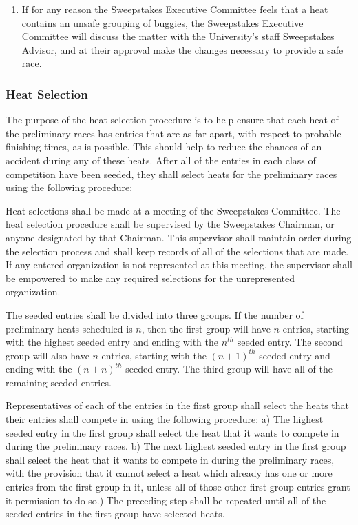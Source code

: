 \begin{enumerate}
		\item If for any reason the Sweepstakes Executive Committee feels that
		a heat contains an unsafe grouping of buggies, the Sweepstakes Executive
		Committee will discuss the matter with the University's staff Sweepstakes
		Advisor, and at their approval make the changes necessary to provide a safe
		race.

	\end{enumerate}

\subsubsection{Heat Selection}
	
	The purpose of the heat selection procedure is to help ensure that each heat of
	the preliminary races has entries that are as far apart, with respect to
	probable finishing times, as is possible. This should help to reduce the
	chances of an accident during any of these heats. After all of the entries in
	each class of competition have been seeded, they shall select heats for the
	preliminary races using the following procedure:

	Heat selections shall be made at a meeting of the Sweepstakes Committee. The
	heat selection procedure shall be supervised by the Sweepstakes Chairman, or
	anyone designated by that Chairman. This supervisor shall maintain order during
	the selection process and shall keep records of all of the selections that are
	made. If any entered organization is not represented at this meeting, the
	supervisor shall be empowered to make any required selections for the
	unrepresented organization.

	The seeded entries shall be divided into three groups. If the number of
	preliminary heats scheduled is $n$, then the first group will have $n$ entries,
	starting with the highest seeded entry and ending with the $n^{th}$ seeded
	entry. The second group will also have $n$ entries, starting with the
	$(n+1)^{th}$ seeded entry and ending with the $(n+n)^{th}$ seeded entry. The
	third group will have all of the remaining seeded entries.

	Representatives of each of the entries in the first group shall select the
	heats that their entries shall compete in using the following procedure: a) The
	highest seeded entry in the first group shall select the heat that it wants to
	compete in during the preliminary races. b) The next highest seeded entry in
	the first group shall select the heat that it wants to compete in during the
	preliminary races, with the provision that it cannot select a heat which
	already has one or more entries from the first group in it, unless all of those
	other first group entries grant it permission to do so.) The preceding step
	shall be repeated until all of the seeded entries in the first group have
	selected heats.

